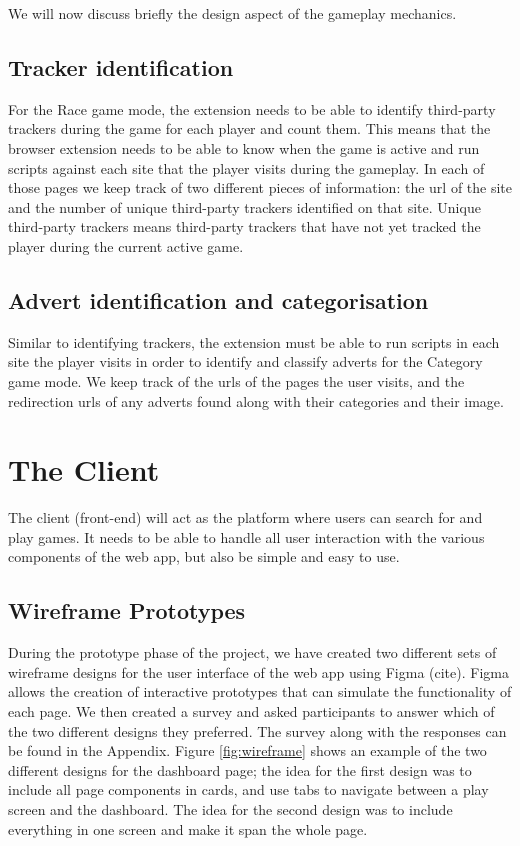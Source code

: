 \documentclass{l4proj}
\begin{document}
We will now discuss briefly the design aspect of the gameplay mechanics.

\subsection{Tracker identification}
For the Race game mode, the extension needs to be able to identify third-party trackers during the game for each player and count them. This means that the browser extension needs to be able to know when the game is active and run scripts against each site that the player visits during the gameplay. In each of those pages we keep track of two different pieces of information: the url of the site and the number of unique third-party trackers identified on that site. Unique third-party trackers means third-party trackers that have not yet tracked the player during the current active game.

\subsection{Advert identification and categorisation}
Similar to identifying trackers, the extension must be able to run scripts in each site the player visits in order to identify and classify adverts for the Category game mode. We keep track of the urls of the pages the user visits, and the redirection urls of any adverts found along with their categories and their image. 

\section{The Client}
The client (front-end) will act as the platform where users can search for and play games. It needs to be able to handle all user interaction with the various components of the web app, but also be simple and easy to use.

\subsection{Wireframe Prototypes}
During the prototype phase of the project, we have created two different sets of wireframe designs for the user interface of the web app using Figma (cite). Figma allows the creation of interactive prototypes that can simulate the functionality of each page. We then created a survey and asked participants to answer which of the two different designs they preferred. The survey along with the responses can be found in the Appendix. Figure \ref{fig:wireframe} shows an example of the two different designs for the dashboard page; the idea for the first design was to include all page components in cards, and use tabs to navigate between a play screen and the dashboard. The idea for the second design was to include everything in one screen and make it span the whole page.
\end{document}
